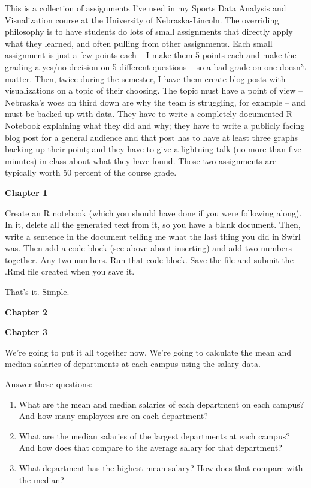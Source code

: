 \documentclass[]{book}
\providecommand{\tightlist}{%
  \setlength{\itemsep}{0pt}\setlength{\parskip}{0pt}}
\begin{document}
This is a collection of assignments I've used in my Sports Data Analysis
and Visualization course at the University of Nebraska-Lincoln. The
overriding philosophy is to have students do lots of small assignments
that directly apply what they learned, and often pulling from other
assignments. Each small assignment is just a few points each -- I make
them 5 points each and make the grading a yes/no decision on 5 different
questions -- so a bad grade on one doesn't matter. Then, twice during
the semester, I have them create blog posts with visualizations on a
topic of their choosing. The topic must have a point of view --
Nebraska's woes on third down are why the team is struggling, for
example -- and must be backed up with data. They have to write a
completely documented R Notebook explaining what they did and why; they
have to write a publicly facing blog post for a general audience and
that post has to have at least three graphs backing up their point; and
they have to give a lightning talk (no more than five minutes) in class
about what they have found. Those two assignments are typically worth 50
percent of the course grade.

\textbf{Chapter 1}

Create an R notebook (which you should have done if you were following
along). In it, delete all the generated text from it, so you have a
blank document. Then, write a sentence in the document telling me what
the last thing you did in Swirl was. Then add a code block (see above
about inserting) and add two numbers together. Any two numbers. Run that
code block. Save the file and submit the .Rmd file created when you save
it.

That's it. Simple.

\textbf{Chapter 2}

\textbf{Chapter 3}

We're going to put it all together now. We're going to calculate the
mean and median salaries of departments at each campus using the salary
data.

Answer these questions:

\begin{enumerate}
\def\labelenumi{\arabic{enumi}.}
\tightlist
\item
  What are the mean and median salaries of each department on each
  campus? And how many employees are on each department?
\item
  What are the median salaries of the largest departments at each
  campus? And how does that compare to the average salary for that
  department?
\item
  What department has the highest mean salary? How does that compare
  with the median?
\end{enumerate}
\end{document}
